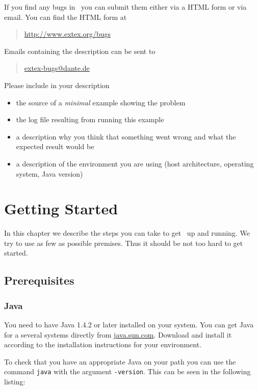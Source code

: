 \documentclass{extex-doc}
\begin{document}
If you find any bugs in \ExTeX\ you can submit them either via a HTML
form or via email. You can find the HTML form at
\begin{quotation}
  \url{http://www.extex.org/bugs}
\end{quotation}
Emails containing the description can be sent to
\begin{quotation}
  \href{mailto:extex-bugs@dante.de}{extex-bugs@dante.de}
\end{quotation}

Please include in your description 
\begin{itemize}
\item the source of a \emph{minimal} example showing the problem
\item the log file resulting from running this example
\item a description why you think that something went wrong and what
  the expected result would be
\item a description of the environment you are using (host
  architecture, operating system, Java version)
\end{itemize}


\chapter{Getting Started}

In this chapter we describe the steps you can take to get \ExTeX\ up
and running. We try to use as few as possible premises. Thus it should
be not too hard to get started.

\section{Prerequisites}

\subsection{Java}

You need to have Java 1.4.2 or later installed on your
system. You can get Java for a several systems directly from
\url{java.sun.com}. Download and install it according to the
installation instructions for your environment.

To check that you have an appropriate Java on your path you can use
the command \texttt{java} with the argument \texttt{-version}. This
can be seen in the following listing:
\end{document}
